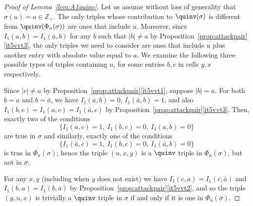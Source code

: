 \begin{proof}[Proof of Lemma~\ref{lem:A1quinv}]
Let us assume without loss of generality that $\sigma(u)=a\in\mathbb{Z}_+$. The only triples whose contribution to $\quinv(\sigma)$ is different from $\quinv(\Phi_u(\sigma))$ are ones that include $u$. Moreover, since $I_1(a,b)=I_1(\bar{a},b)$ for any $b$ such that $|b| \neq a$ by Proposition~\ref{prop:attackpair}\ref{it5vvt3}, the only triples we need to consider are ones that include $u$ plus another entry with absolute value equal to $a$. We examine the following three possible types of triples containing $u$, for some entries $b,c$ in cells $y,x$ respectively.
\begin{flushleft}
\end{flushleft}
Since $|c|\neq a$ by Proposition~\ref{prop:attackpair}\ref{it5vvt1}, suppose $|b|=a$. For both $b=a$ and $b=\bar{a}$, we have $I_1(a,b)=0$, $I_1(\bar{a},b)=1$, and also $I_1(b,c)=I_1(a,c)=I_1(\bar{a},c)$ by Proposition~\ref{prop:attackpair}\ref{it5vvt3}. Then, exactly two of the conditions
\[\{I_1(a,c)=1,\ I_1(b,c)=0,\  I_1(a,b)=0\}\]
are true in $\sigma$ and similarly, exactly one of the conditions
\[\{I_1(\bar{a},c)=1,\ I_1(b,c)=0,\ I_1(\bar{a},b)=0\}\]
is true in $\Phi_u(\sigma)$; hence the triple $(u,x,y)$ is a $\quinv$ triple in $\Phi_u(\sigma)$, but not in $\sigma$.
\begin{flushleft}
\end{flushleft}
For any $x,y$ (including when $y$ does not exist) we have $I_1(c,a)=I_1(c,\bar{a})$ and $I_1(b,a)=I_1(b,\bar{a})$ by Proposition~\ref{prop:attackpair}\ref{it5vvt2}, and so the triple $(y,u,x)$ is trivially a $\quinv$ triple in $\sigma$ if and only if it is one in $\Phi_u(\sigma)$.


\end{proof}
